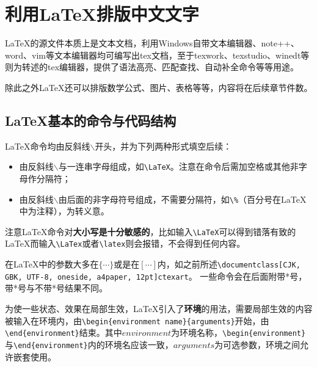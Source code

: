 \chapter{利用\LaTeX 排版中文文字}
\LaTeX 的源文件本质上是文本文档，利用Windows自带文本编辑器、note++、word、vim等文本编辑器均可编写出tex文档，至于texwork、texstudio、winedt等则为转述的tex编辑器，提供了语法高亮、匹配查找、自动补全命令等等用途。

除此之外\LaTeX 还可以排版数学公式、图片、表格等等，内容将在后续章节件数。
\section{\LaTeX 基本的命令与代码结构}
\LaTeX 命令均由反斜线$\backslash$开头，并为下列两种形式填空后续：
\begin{itemize}
\item 由反斜线$\backslash$与一连串字母组成，如\verb|\LaTeX|。注意在命令后需加空格或其他非字母作分隔符；
\item 由反斜线$\backslash$由后面的非字母符号组成，不需要分隔符，如\verb|\%|（百分号在\LaTeX 中为注释），为转义意。
\end{itemize}

注意\LaTeX 命令对\textbf{大小写是十分敏感的}，比如输入\verb|\LaTeX|可以得到错落有致的\LaTeX 而输入\verb|\LaTex|或者\verb|\latex|则会报错，不会得到任何内容。

在\LaTeX 中的参数大多在$\{\cdots\}$或是在$[\cdots]$内，如之前所述\verb|\documentclass|\texttt{[CJK, GBK, UTF-8, oneside, a4paper, 12pt]{ctexart}}。
一些命令会在后面附带*号，带*号与不带*号结果不同。

为使一些状态、效果在局部生效，\LaTeX 引入了\textbf{环境}的用法，需要局部生效的内容被输入在环境内，由\verb|\begin{environment name}{arguments}|开始，由\verb|\end{environment}|结束。其中$environment$为环境名称，\verb|\begin{environment}|与\verb|\end{environment}|内的环境名应该一致，$arguments$为可选参数，环境之间允许嵌套使用。
